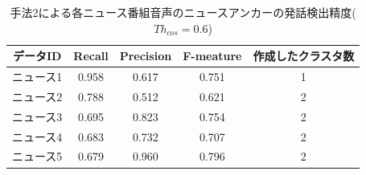 \begin{table}[H]
  \begin{center}
    \caption{手法2による各ニュース番組音声のニュースアンカーの発話検出精度($Th_{cos}=0.6$) }
    \begin{tabular}{|c||c|c|c|c|} \hline
データID & Recall & Precision & F-meature & 作成したクラスタ数\\ \hline
ニュース1 & 0.958 & 0.617 & 0.751 & 1 \\ \hline
ニュース2 & 0.788 & 0.512 & 0.621 & 2 \\ \hline
ニュース3 & 0.695 & 0.823 & 0.754 & 2 \\ \hline
ニュース4 & 0.683 & 0.732 & 0.707 & 2 \\ \hline
ニュース5 & 0.679 & 0.960 & 0.796 & 2 \\ \hline
    \end{tabular}
  \end{center}
\end{table}

